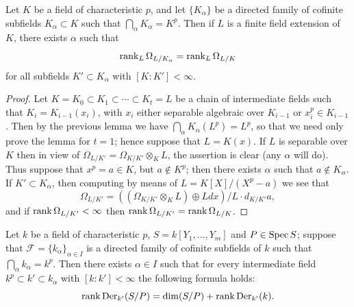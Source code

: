 \begin{lemma}\label{lem:30.6}
Let $K$ be a field of characteristic $p$, and let $\{K_\alpha\}$ be a directed family of
cofinite subfields $K_\alpha \subset K$ such that $\bigcap_\alpha K_\alpha = K^p$. Then if $L$ is a
finite field extension of $K$, there exists $\alpha$ such that
\[
  \operatorname{rank}_L \Omega_{L/K_\alpha} = \operatorname{rank}_L \Omega_{L/K}
\]
for all subfields $K' \subset K_\alpha$ with $[K : K'] < \infty$.
\end{lemma}

\begin{proof}
Let $K = K_0 \subset K_1 \subset \cdots \subset K_t = L$ be a chain of intermediate
fields such that $K_i = K_{i-1}(x_i)$, with $x_i$ either separable algebraic over
$K_{i-1}$ or $x_i^p \in K_{i-1}$. Then by the previous lemma we have
$\bigcap_\alpha K_\alpha(L^p) = L^p$, so that we need only prove the lemma for $t = 1$;
hence suppose that $L = K(x)$. If $L$ is separable over $K$ then in view of
$\Omega_{L/K'} = \Omega_{K/K'} \otimes_K L$, the assertion is clear (any $\alpha$ will do). Thus
suppose that $x^p = a \in K$, but $a \notin K^p$; then there exists $\alpha$ such that
$a \notin K_\alpha$. If $K' \subset K_\alpha$, then computing by means of
$L = K[X]/(X^p - a)$ we see that
\[
  \Omega_{L/K'} = ((\Omega_{K/K'} \otimes_K L) \oplus Ldx)/L \cdot d_{K/K'}a,
\]
and if $\operatorname{rank} \Omega_{L/K'} < \infty$ then $\operatorname{rank} \Omega_{L/K'} = \operatorname{rank} \Omega_{L/K}$.
\end{proof}

\begin{theorem}\label{thm:30.9}
Let $k$ be a field of characteristic $p$, $S = k[Y_1, \ldots, Y_m]$ and $P \in \operatorname{Spec} S$;
suppose that $\mathcal{F} = \{k_\alpha\}_{\alpha \in I}$ is a directed family of cofinite subfields of
$k$ such that $\bigcap_\alpha k_\alpha = k^p$. Then there exists $\alpha \in I$ such that for
every intermediate field $k^p \subset k' \subset k_\alpha$ with $[k : k'] < \infty$ the
following formula holds:
\[
  \operatorname{rank} \operatorname{Der}_{k'}(S/P) = \dim(S/P) + \operatorname{rank} \operatorname{Der}_{k'}(k).
\]
\end{theorem}

